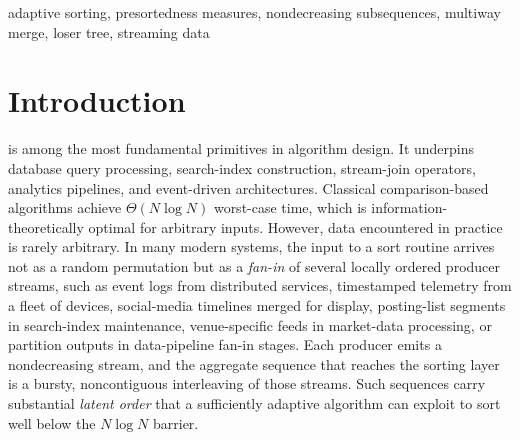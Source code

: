 \documentclass{ieeeaccess}
\theoremstyle{plain}
\theoremstyle{definition}
\begin{document}
\begin{keywords}
adaptive sorting, presortedness measures, nondecreasing subsequences, multiway merge, loser tree, streaming data
\end{keywords}

\titlepgskip=-21pt

\maketitle

\section{Introduction}
\label{sec:intro}

 is among the most fundamental primitives in algorithm design. It underpins database query processing, search-index construction, stream-join operators, analytics pipelines, and event-driven architectures.  Classical comparison-based algorithms achieve $\Theta(N\log N)$ worst-case time, which is information-theoretically optimal for arbitrary inputs.  However, data encountered in practice is rarely arbitrary.  In many modern systems, the input to a sort routine arrives not as a random permutation but as a {\em fan-in} of several locally ordered producer streams, such as event logs from distributed services, timestamped telemetry from a fleet of devices, social-media timelines merged for display, posting-list segments in search-index maintenance, venue-specific feeds in market-data processing, or partition outputs in data-pipeline fan-in stages.  Each producer emits a nondecreasing stream, and the aggregate sequence that reaches the sorting layer is a bursty, noncontiguous interleaving of those streams.  Such sequences carry substantial \emph{latent order} that a sufficiently adaptive algorithm can exploit to sort well below the $N\log N$ barrier.
\end{document}
